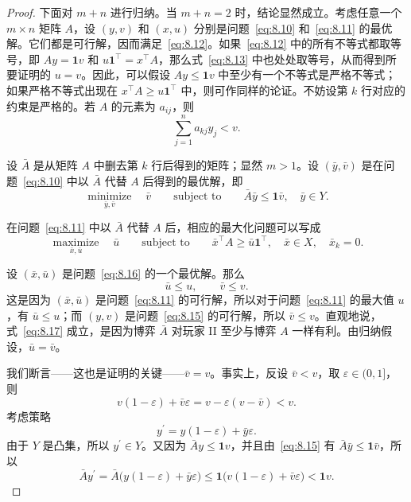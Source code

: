 \begin{proof}
下面对 \(m+n\) 进行归纳。当 \(m+n=2\) 时，结论显然成立。考虑任意一个 \(m\times n\) 矩阵 \(A\)，设 \((y,v)\) 和 \((x,u)\) 分别是问题~\eqref{eq:8.10} 和~\eqref{eq:8.11} 的最优解。它们都是可行解，因而满足~\eqref{eq:8.12}。如果~\eqref{eq:8.12} 中的所有不等式都取等号，即 \(Ay=\mathbf{1}v\) 和 \(u\mathbf{1}^{\top}=x^{\top}A\)，那么式~\eqref{eq:8.13} 中也处处取等号，从而得到所要证明的 \(u=v\)。因此，可以假设 \(Ay\leq\mathbf{1}v\) 中至少有一个不等式是严格不等式；如果严格不等式出现在 \(x^{\top}A\geq u\mathbf{1}^{\top}\) 中，则可作同样的论证。不妨设第 \(k\) 行对应的约束是严格的。若 \(A\) 的元素为 \(a_{ij}\)，则
\begin{equation}\label{eq:8.14}
\sum_{j=1}^{n}a_{kj}y_j<v.
\end{equation}

设 \(\bar{A}\) 是从矩阵 \(A\) 中删去第 \(k\) 行后得到的矩阵；显然 \(m>1\)。设 \((\bar{y},\bar{v})\) 是在问题~\eqref{eq:8.10} 中以 \(\bar{A}\) 代替 \(A\) 后得到的最优解，即
\begin{equation}\label{eq:8.15}
\underset{\bar{y},\bar{v}}{\operatorname{minimize}}\quad\bar{v}
\qquad\text{subject to}\qquad
\bar{A}\bar{y}\leq\mathbf{1}\bar{v},\quad\bar{y}\in Y.
\end{equation}

在问题~\eqref{eq:8.11} 中以 \(\bar{A}\) 代替 \(A\) 后，相应的最大化问题可以写成
\begin{equation}\label{eq:8.16}
\underset{\bar{x},\bar{u}}{\operatorname{maximize}}\quad\bar{u}
\qquad\text{subject to}\qquad
\bar{x}^{\top}A\geq\bar{u}\mathbf{1}^{\top},\quad
\bar{x}\in X,\quad\bar{x}_k=0.
\end{equation}

设 \((\bar{x},\bar{u})\) 是问题~\eqref{eq:8.16} 的一个最优解。那么
\begin{equation}\label{eq:8.17}
\bar{u}\leq u,\qquad\bar{v}\leq v.
\end{equation}
这是因为 \((\bar{x},\bar{u})\) 是问题~\eqref{eq:8.11} 的可行解，所以对于问题~\eqref{eq:8.11} 的最大值 \(u\)，有 \(\bar{u}\leq u\)；而 \((y,v)\) 是问题~\eqref{eq:8.15} 的可行解，所以 \(\bar{v}\leq v\)。直观地说，式~\eqref{eq:8.17} 成立，是因为博弈 \(\bar{A}\) 对玩家 II 至少与博弈 \(A\) 一样有利。由归纳假设，\(\bar{u}=\bar{v}\)。

我们断言——这也是证明的关键——\(\bar{v}=v\)。事实上，反设 \(\bar{v}<v\)，取 \(\varepsilon\in(0,1]\)，则
\[
v(1-\varepsilon)+\bar{v}\varepsilon
=v-\varepsilon(v-\bar{v})<v.
\]
考虑策略
\[
y^{\prime}=y(1-\varepsilon)+\bar{y}\varepsilon.
\]
由于 \(Y\) 是凸集，所以 \(y^{\prime}\in Y\)。又因为 \(\bar{A}y\leq\mathbf{1}v\)，并且由~\eqref{eq:8.15} 有 \(\bar{A}\bar{y}\leq\mathbf{1}\bar{v}\)，所以
\[
\bar{A}y^{\prime}
=\bar{A}\bigl(y(1-\varepsilon)+\bar{y}\varepsilon\bigr)
\leq\mathbf{1}\bigl(v(1-\varepsilon)+\bar{v}\varepsilon\bigr)
<\mathbf{1}v.
\]


\end{proof}
